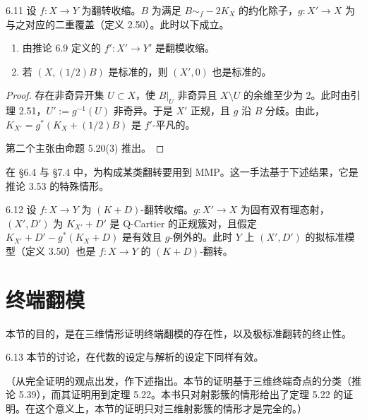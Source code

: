 
\begin{lemmap}{6.11}
设 $f:X\to Y$ 为翻转收缩。$B$ 为满足 $B\sim_f-2K_X$ 的约化除子，$g:X'\to X$ 为与之对应的二重覆盖（定义 2.50）。此时以下成立。
\begin{enumerate}[label=（\arabic*）,leftmargin=3.2em]
\item 由推论 6.9 定义的 $f':X'\to Y'$ 是翻模收缩。
\item 若 $(X,(1/2)B)$ 是标准的，则 $(X',0)$ 也是标准的。
\end{enumerate}
\end{lemmap}

\begin{proof}
存在非奇异开集 $U\subset X$，使 $B|_U$ 非奇异且 $X\setminus U$ 的余维至少为 2。此时由引理 2.51，$U':=g^{-1}(U)$ 非奇异。于是 $X'$ 正规，且 $g$ 沿 $B$ 分歧。由此，$K_{X'}=g^*(K_X+(1/2)B)$ 是 $f'$-平凡的。

第二个主张由命题 5.20(3) 推出。
\end{proof}

在 §6.4 与 §7.4 中，为构成某类翻转要用到 MMP。这一手法基于下述结果，它是推论 3.53 的特殊情形。

\begin{proposition}{6.12}
设 $f:X\to Y$ 为 $(K+D)$-翻转收缩。$g:X'\to X$ 为固有双有理态射，$(X',D')$ 为 $K_{X'}+D'$ 是 Q-Cartier 的正规簇对，且假定 $K_{X'}+D'-g^*(K_X+D)$ 是有效且 $g$-例外的。此时 $Y$ 上 $(X',D')$ 的拟标准模型（定义 3.50）也是 $f:X\to Y$ 的 $(K+D)$-翻转。
\end{proposition}

\section{终端翻模}

本节的目的，是在三维情形证明终端翻模的存在性，以及极标准翻转的终止性。

\begin{remark}{6.13}
本节的讨论，在代数的设定与解析的设定下同样有效。

（从完全证明的观点出发，作下述指出。本节的证明基于三维终端奇点的分类（推论 5.39），而其证明用到定理 5.22。本书只对射影簇的情形给出了定理 5.22 的证明。在这个意义上，本节的证明只对三维射影簇的情形才是完全的。）
\end{remark}

